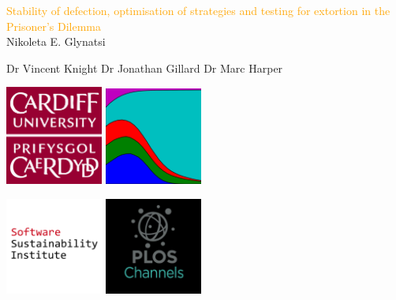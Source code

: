\documentclass{beamer}
\begin{document}
\begin{frame}
    \begin{center}
        \Large{\textcolor{orange}{Stability of defection, optimisation of
        strategies and testing for extortion in the Prisoner's Dilemma}} \\

        \vspace{1.5cm}
        \normalsize{Nikoleta E. Glynatsi}

        \vspace{1cm}
        \small{Dr Vincent Knight} \hspace{4mm} \small{Dr Jonathan Gillard} \hspace{4mm} \small{Dr Marc Harper}

    \end{center}
\end{frame}

\begin{frame}
    \begin{center}
    \includegraphics[width=0.24\textwidth]{static/cardiff_uni_logo.jpg}\hspace{10pt}
    \includegraphics[width=0.24\textwidth]{static/axelrod-logo.png}\vspace{10pt}

    \includegraphics[width=0.24\textwidth]{static/ssi-logo.png} \hspace{10pt}
    \includegraphics[width=0.24\textwidth]{static/plos-logo.jpg}
    \vspace{10pt}
    \end{center}
\end{frame}
\end{document}
